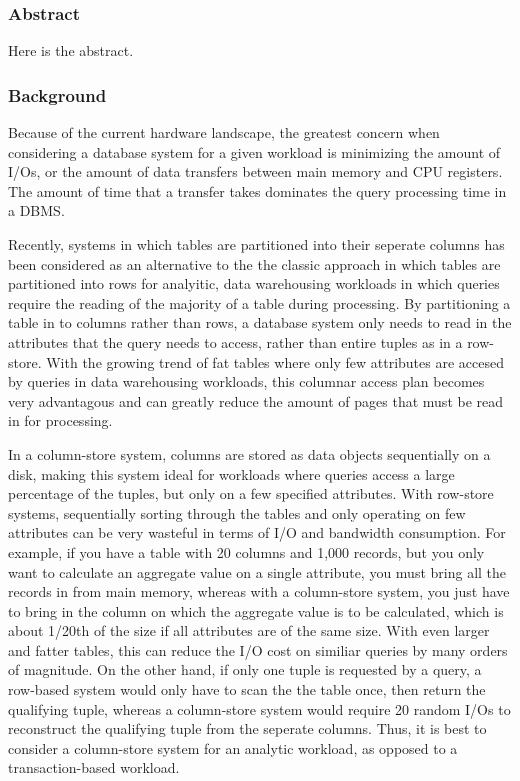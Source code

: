 

\subsubsection*{Abstract}
Here is the abstract.


\subsubsection*{Background}
Because of the current hardware landscape, the greatest concern when considering a database system for a given workload is minimizing the amount of I/Os, or the amount of data transfers between main memory and CPU registers. The amount of time that a transfer takes dominates the query processing time in a DBMS. 


Recently, systems in which tables are partitioned into their seperate columns has been considered as an alternative to the the classic approach in which tables are partitioned into rows for analyitic, data warehousing workloads in which queries require the reading of the majority of a table during processing\cite{columnOverview}. By partitioning a table in to columns rather than rows, a database system only needs to read in the attributes that the query needs to access, rather than entire tuples as in a row-store. With the growing trend of fat tables where only few attributes are accesed by queries in data warehousing workloads, this columnar access plan becomes very advantagous and can greatly reduce the amount of pages that must be read in for processing\cite{now}.


In a column-store system, columns are stored as data objects sequentially on a disk, making this system ideal for workloads where queries access a large percentage of the tuples, but only on a few specified attributes\cite{now}. With row-store systems, sequentially sorting through the tables and only operating on few attributes can be very wasteful in terms of I/O and bandwidth consumption. For example, if you have a table with 20 columns and 1,000 records, but you only want to calculate an aggregate value on a single attribute, you must bring all the records in from main memory, whereas with a column-store system, you just have to bring in the column on which the aggregate value is to be calculated, which is about 1/20th of the size if all attributes are of the same size. With even larger and fatter tables, this can reduce the I/O cost on similiar queries by many orders of magnitude. On the other hand, if only one tuple is requested by a query, a row-based system would only have to scan the the table once, then return the qualifying tuple, whereas a column-store system would require 20 random I/Os to reconstruct the qualifying tuple from the seperate columns. Thus, it is best to consider a column-store system for an analytic workload, as opposed to a transaction-based workload. 


